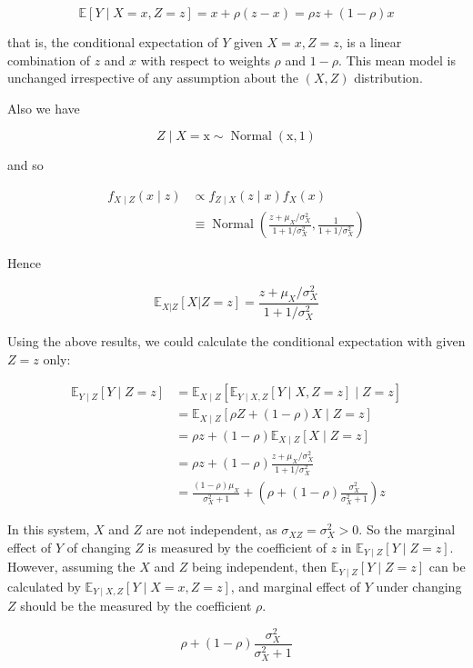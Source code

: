 \documentclass[
]{book}
\begin{document}
\[ \mathbb{E}[Y \mid X=x, Z=z]=x+\rho(z-x)=\rho z+(1-\rho) x \]

that is, the conditional expectation of \(Y\) given \(X=x, Z=z\), is a linear combination of \(z\) and \(x\) with respect to weights \(\rho\) and \(1-\rho\). This mean model is unchanged irrespective of any assumption about the \((X,Z)\) distribution.

Also we have

\[
Z \mid X=\mathrm{x} \sim \operatorname{Normal}(\mathrm{x}, 1)
\]

and so

\[
\begin{aligned}
f_{X \mid Z}(x \mid z) & \propto f_{Z \mid X}(z \mid x) f_X(x) \\
& \equiv \operatorname{Normal}\left(\frac{z+\mu_X / \sigma_X^2}{1+1 / \sigma_X^2}, \frac{1}{1+1 / \sigma_X^2}\right)
\end{aligned}
\]

Hence

\[
\mathbb{E}_{X|Z}[X|Z=z] = \frac{z+\mu_X / \sigma_X^2}{1+1 / \sigma_X^2}
\]

Using the above results, we could calculate the conditional expectation with given \(Z=z\) only:

\[ 
\begin{aligned}
\mathbb{E}_{Y \mid Z}[Y \mid Z=z] & =\mathbb{E}_{X \mid Z}\left[\mathbb{E}_{Y \mid X, Z}[Y \mid X, Z=z] \mid Z=z\right] \\
& =\mathbb{E}_{X \mid Z}[\rho Z+(1-\rho) X \mid Z=z] \\
& =\rho z+(1-\rho) \mathbb{E}_{X \mid Z}[X \mid Z=z] \\
& =\rho z+(1-\rho) \frac{z+\mu_X / \sigma_X^2}{1+1 / \sigma_X^2} \\
& =\frac{(1-\rho) \mu_X}{\sigma_X^2+1}+\left(\rho+(1-\rho) \frac{\sigma_X^2}{\sigma_X^2+1}\right) z
\end{aligned}
\]

In this system, \(X\) and \(Z\) are not independent, as \(\sigma_{XZ} = \sigma_X^{2} > 0\). So the marginal effect of \(Y\) of changing \(Z\) is measured by the coefficient of \(z\) in \(\mathbb{E}_{Y \mid Z}[Y \mid Z=z]\). However, assuming the \(X\) and \(Z\) being independent, then \(\mathbb{E}_{Y \mid Z}[Y \mid Z=z]\) can be calculated by \(\mathbb{E}_{Y \mid X, Z}[Y \mid X=x, Z=z]\), and marginal effect of \(Y\) under changing \(Z\) should be the measured by the coefficient \(\rho\).

\[ 
\rho+(1-\rho) \frac{\sigma_X^2}{\sigma_X^2+1}
\]
\end{document}
